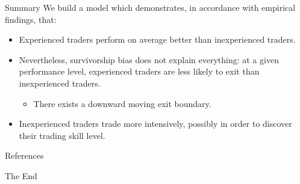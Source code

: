 \documentclass{beamer}
\begin{document}
\begin{frame}{Summary}
We build a model which demonstrates, in accordance with empirical findings, that:
\begin{itemize}
\item Experienced traders perform on average better than inexperienced traders.
\item Nevertheless, survivorship bias does not explain everything: at a given performance level, experienced traders are less likely to exit than inexperienced traders.
\begin{itemize}
	\item There exists a downward moving exit boundary.
\end{itemize}
\item Inexperienced traders trade more intensively, possibly in order to discover their trading skill level.
\end{itemize}
\end{frame}


\begin{frame}[allowframebreaks]{References}
	
	
\end{frame}

\begin{frame}
\Huge{\centerline{The End}}
\end{frame}
\end{document}
